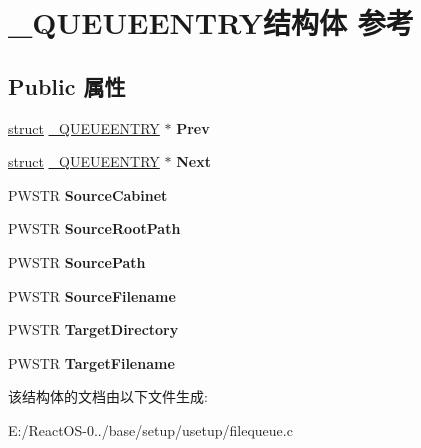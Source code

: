 \hypertarget{struct___q_u_e_u_e_e_n_t_r_y}{}\section{\+\_\+\+Q\+U\+E\+U\+E\+E\+N\+T\+R\+Y结构体 参考}
\label{struct___q_u_e_u_e_e_n_t_r_y}
\subsection*{Public 属性}
\begin{DoxyCompactItemize}
\item 
\mbox{\label{struct___q_u_e_u_e_e_n_t_r_y_a90d20f58d6ae3bfb25753ac9cf405999}} 
\hyperlink{interfacestruct}{struct} \hyperlink{struct___q_u_e_u_e_e_n_t_r_y}{\+\_\+\+Q\+U\+E\+U\+E\+E\+N\+T\+RY} $\ast$ {\bfseries Prev}
\item 
\mbox{\label{struct___q_u_e_u_e_e_n_t_r_y_a7bf2771fe2f90b76856117b412bb8c7d}} 
\hyperlink{interfacestruct}{struct} \hyperlink{struct___q_u_e_u_e_e_n_t_r_y}{\+\_\+\+Q\+U\+E\+U\+E\+E\+N\+T\+RY} $\ast$ {\bfseries Next}
\item 
\mbox{\label{struct___q_u_e_u_e_e_n_t_r_y_a69f84f02761b55a5b05f5b36062fd996}} 
P\+W\+S\+TR {\bfseries Source\+Cabinet}
\item 
\mbox{\label{struct___q_u_e_u_e_e_n_t_r_y_a6ac11ea8ccd92c328c7418026d895efa}} 
P\+W\+S\+TR {\bfseries Source\+Root\+Path}
\item 
\mbox{\label{struct___q_u_e_u_e_e_n_t_r_y_ac2f33744abe93eb2ee03aefe274ffa95}} 
P\+W\+S\+TR {\bfseries Source\+Path}
\item 
\mbox{\label{struct___q_u_e_u_e_e_n_t_r_y_a79489e500c49760af19a220932d29d0e}} 
P\+W\+S\+TR {\bfseries Source\+Filename}
\item 
\mbox{\label{struct___q_u_e_u_e_e_n_t_r_y_af383a7c772fe3f8c52be21b5848b7e5b}} 
P\+W\+S\+TR {\bfseries Target\+Directory}
\item 
\mbox{\label{struct___q_u_e_u_e_e_n_t_r_y_a006a6544acbbf919a73b86ceb1a58edd}} 
P\+W\+S\+TR {\bfseries Target\+Filename}
\end{DoxyCompactItemize}


该结构体的文档由以下文件生成\+:\begin{DoxyCompactItemize}
\item 
E\+:/\+React\+O\+S-\/0../base/setup/usetup/filequeue.\+c\end{DoxyCompactItemize}
